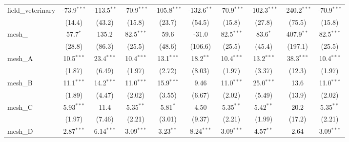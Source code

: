 \begin{tabular}{lccccccccc}
   field\_veterinary                                           & -73.9$^{***}$ & -113.5$^{**}$  & -70.9$^{***}$ & -105.8$^{***}$ & -132.6$^{**}$  & -70.9$^{***}$ & -102.3$^{***}$ & -240.2$^{***}$ & -70.9$^{***}$\\   
                                                               & (14.4)        & (43.2)         & (15.8)        & (23.7)         & (54.5)         & (15.8)        & (27.8)         & (75.5)         & (15.8)\\   
   mesh\_                                                      & 57.7$^{*}$    & 135.2          & 82.5$^{***}$  & 59.6           & -31.0          & 82.5$^{***}$  & 83.6$^{*}$     & 407.9$^{**}$   & 82.5$^{***}$\\   
                                                               & (28.8)        & (86.3)         & (25.5)        & (48.6)         & (106.6)        & (25.5)        & (45.4)         & (197.1)        & (25.5)\\   
   mesh\_A                                                     & 10.5$^{***}$  & 23.4$^{***}$   & 10.4$^{***}$  & 13.1$^{***}$   & 18.2$^{**}$    & 10.4$^{***}$  & 13.2$^{***}$   & 38.3$^{***}$   & 10.4$^{***}$\\   
                                                               & (1.87)        & (6.49)         & (1.97)        & (2.72)         & (8.03)         & (1.97)        & (3.37)         & (12.3)         & (1.97)\\   
   mesh\_B                                                     & 11.1$^{***}$  & 14.2$^{***}$   & 11.0$^{***}$  & 15.9$^{***}$   & 9.46           & 11.0$^{***}$  & 25.0$^{***}$   & 13.6           & 11.0$^{***}$\\   
                                                               & (1.89)        & (4.47)         & (2.02)        & (3.55)         & (6.67)         & (2.02)        & (5.49)         & (13.9)         & (2.02)\\   
   mesh\_C                                                     & 5.93$^{***}$  & 11.4           & 5.35$^{**}$   & 5.81$^{*}$     & 4.50           & 5.35$^{**}$   & 5.42$^{**}$    & 20.2           & 5.35$^{**}$\\   
                                                               & (1.97)        & (7.46)         & (2.21)        & (3.01)         & (9.37)         & (2.21)        & (1.99)         & (17.2)         & (2.21)\\   
   mesh\_D                                                     & 2.87$^{***}$  & 6.14$^{***}$   & 3.09$^{***}$  & 3.23$^{**}$    & 8.24$^{***}$   & 3.09$^{***}$  & 4.57$^{**}$    & 2.64           & 3.09$^{***}$\\   

\end{tabular}
